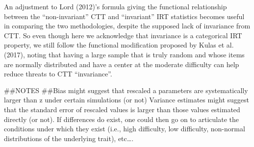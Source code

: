\documentclass[
  man]{apa6}
\begin{document}
An adjustment to Lord (2012)'s formula giving the functional relationship between the ``non-invariant'' CTT and ``invariant'' IRT statistics becomes useful in comparing the two methodologies, despite the supposed lack of invariance from CTT. So even though here we acknowledge that invariance is a categorical IRT property, we still follow the functional modification proposed by Kulas et al. (2017), noting that having a large sample that is truly random and whose items are normally distributed and have a center at the moderate difficulty can help reduce threats to CTT ``invariance''.

\#\#NOTES
\#\#Bias might suggest that rescaled a parameters are systematically larger than z under certain simulations (or not) Variance estimates might suggest that the standard error of rescaled values is larger than those values estimated directly (or not). If differences do exist, one could then go on to articulate the conditions under which they exist (i.e., high difficulty, low difficulty, non-normal distributions of the underlying trait), etc\ldots.
\end{document}
